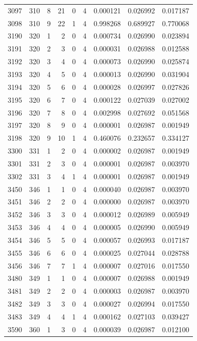 \begin{longtable}{rrrrrrrrr}
3097 & 310 & 8 & 21 & 0 & 4 & 0.000121 & 0.026992 & 0.017187 \\
3098 & 310 & 9 & 22 & 1 & 4 & 0.998268 & 0.689927 & 0.770068 \\
3190 & 320 & 1 & 2 & 0 & 4 & 0.000734 & 0.026990 & 0.023894 \\
3191 & 320 & 2 & 3 & 0 & 4 & 0.000031 & 0.026988 & 0.012588 \\
3192 & 320 & 3 & 4 & 0 & 4 & 0.000073 & 0.026990 & 0.025874 \\
3193 & 320 & 4 & 5 & 0 & 4 & 0.000013 & 0.026990 & 0.031904 \\
3194 & 320 & 5 & 6 & 0 & 4 & 0.000028 & 0.026997 & 0.027826 \\
3195 & 320 & 6 & 7 & 0 & 4 & 0.000122 & 0.027039 & 0.027002 \\
3196 & 320 & 7 & 8 & 0 & 4 & 0.002998 & 0.027692 & 0.051568 \\
3197 & 320 & 8 & 9 & 0 & 4 & 0.000001 & 0.026987 & 0.001949 \\
3198 & 320 & 9 & 10 & 1 & 4 & 0.460076 & 0.232657 & 0.334127 \\
3300 & 331 & 1 & 2 & 0 & 4 & 0.000002 & 0.026987 & 0.001949 \\
3301 & 331 & 2 & 3 & 0 & 4 & 0.000001 & 0.026987 & 0.003970 \\
3302 & 331 & 3 & 4 & 1 & 4 & 0.000001 & 0.026987 & 0.001949 \\
3450 & 346 & 1 & 1 & 0 & 4 & 0.000040 & 0.026987 & 0.003970 \\
3451 & 346 & 2 & 2 & 0 & 4 & 0.000000 & 0.026987 & 0.003970 \\
3452 & 346 & 3 & 3 & 0 & 4 & 0.000012 & 0.026989 & 0.005949 \\
3453 & 346 & 4 & 4 & 0 & 4 & 0.000005 & 0.026990 & 0.005949 \\
3454 & 346 & 5 & 5 & 0 & 4 & 0.000057 & 0.026993 & 0.017187 \\
3455 & 346 & 6 & 6 & 0 & 4 & 0.000025 & 0.027044 & 0.028788 \\
3456 & 346 & 7 & 7 & 1 & 4 & 0.000007 & 0.027016 & 0.017550 \\
3480 & 349 & 1 & 1 & 0 & 4 & 0.000007 & 0.026988 & 0.001949 \\
3481 & 349 & 2 & 2 & 0 & 4 & 0.000003 & 0.026987 & 0.003970 \\
3482 & 349 & 3 & 3 & 0 & 4 & 0.000027 & 0.026994 & 0.017550 \\
3483 & 349 & 4 & 4 & 1 & 4 & 0.000162 & 0.027103 & 0.039427 \\
3590 & 360 & 1 & 3 & 0 & 4 & 0.000039 & 0.026987 & 0.012100 \\

\end{longtable}
